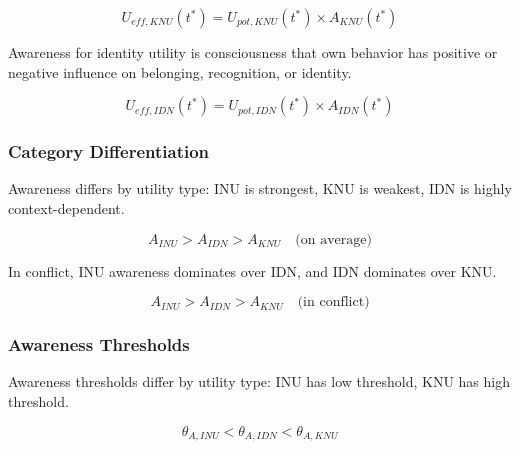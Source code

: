 \begin{equation}
U_{eff,KNU}(t^*) = U_{pot,KNU}(t^*) \times A_{KNU}(t^*)
\end{equation}

\begin{axiom}
\label{ax:awx-a33}
Awareness for identity utility is consciousness that own behavior has 
positive or negative influence on belonging, recognition, or identity.
\end{axiom}

\begin{equation}
U_{eff,IDN}(t^*) = U_{pot,IDN}(t^*) \times A_{IDN}(t^*)
\end{equation}

\subsubsection{Category Differentiation}

\begin{axiom}
\label{ax:awx-a34}
Awareness differs by utility type: INU is strongest, KNU is weakest, 
IDN is highly context-dependent.
\end{axiom}

\begin{equation}
A_{INU} > A_{IDN} > A_{KNU} \quad \text{(on average)}
\end{equation}

\begin{axiom}
\label{ax:awx-a41}
In conflict, INU awareness dominates over IDN, and IDN dominates over KNU.
\end{axiom}

\begin{equation}
A_{INU} > A_{IDN} > A_{KNU} \quad \text{(in conflict)}
\end{equation}

\subsubsection{Awareness Thresholds}

\begin{axiom}
\label{ax:awx-a44}
Awareness thresholds differ by utility type: INU has low threshold, 
KNU has high threshold.
\end{axiom}

\begin{equation}
\theta_{A,INU} < \theta_{A,IDN} < \theta_{A,KNU}
\end{equation}

